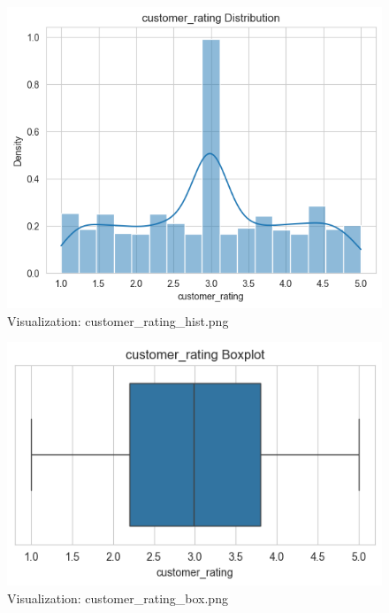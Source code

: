 \documentclass{article}%
\begin{document}
\vspace{10pt}%
\\%
\begin{minipage}[c]{0.48\textwidth}%


\begin{figure}[H]%
\centering%
\includegraphics[width=\linewidth]{output/plots/customer_rating_hist.png}%
\caption{Visualization: customer\_rating\_hist.png}%
\end{figure}

%
\end{minipage}%
\begin{minipage}[c]{0.48\textwidth}%


\begin{figure}[H]%
\centering%
\includegraphics[width=\linewidth]{output/plots/customer_rating_box.png}%
\caption{Visualization: customer\_rating\_box.png}%
\end{figure}

%
\end{minipage}%
\end{document}
